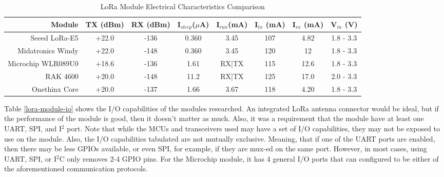 \begin{table}[H]
\centering\scriptsize
\caption{LoRa Module Electrical Characteristics Comparison}
\begin{tabular}{|r|c|c|c|c|c|c|c|}
\hline
Module & TX (dBm) & RX (dBm) & I$_{sleep}$($\mu$A) & I$_{run}$(mA) & I$_{tx}$
(mA) & I$_{rx}$ (mA) &  V$_{in}$ (V) \\
\hline\hline

Seeed LoRa-E5       & +22.0 & -136  & 0.360   & 3.45    & 107 & 4.82  & 1.8 - 3.3 \\\hline
Midatronics Windy   & +22.0 & -148  & 0.360   & 3.45    & 120 & 12    & 1.8 - 3.3 \\\hline
Microchip WLR089U0  & +18.6 & -136  & 1.61    & RX|TX   & 115 & 12.6  & 1.8 - 3.3 \\\hline
RAK 4600            & +20.0 & -148  & 11.2    & RX|TX   & 125 & 17.0  & 2.0 - 3.3 \\\hline
Onethinx Core       & +20.0 & -137  & 1.66    & 3.67    & 118 & 4.20  & 1.8 - 3.3 \\\hline

\end{tabular}
\label{lora-module-electrical-comp}
\end{table}

Table \ref{lora-module-io} shows the I/O capabilities of the modules researched. An
integrated LoRa antenna connector would be ideal, but if the performance of the
module is good, then it doesn't matter as much. Also, it was a requirement that
the module have at least one UART, SPI, and I$^2$ port. Note that while the MCUs
and transceivers used may have a set of I/O capabilities, they may not be
exposed to use on the module. Also, the I/O capabilities tabulated are not
mutually exclusive. Meaning, that if one of the UART ports are enabled, then
there may be less GPIOs available, or even SPI, for example, if they are mux-ed
on the same port. However, in most cases, using UART, SPI, or I$^2$C only
removes 2-4 GPIO pins. For the Microchip module, it has 4 general I/O ports that
can configured to be either of the aforementioned communication protocols.

